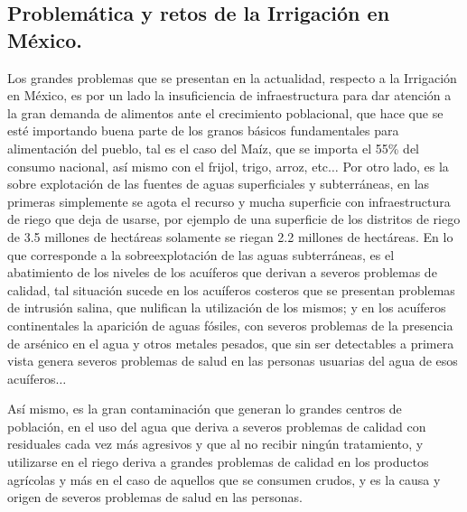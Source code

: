 \subsection{Problemática y retos de la Irrigación en México.}
Los grandes problemas que se presentan en la actualidad, respecto a la Irrigación en México, es por un lado la insuficiencia de infraestructura para dar atención a la gran demanda de alimentos ante el crecimiento poblacional, que hace que se esté importando buena parte de los granos básicos fundamentales para alimentación del pueblo, tal es el caso del Maíz, que se importa el 55\% del consumo nacional, así mismo con el frijol, trigo, arroz, etc$\ldots$ Por otro lado, es la sobre explotación de las fuentes de aguas superficiales y subterráneas, en las primeras simplemente se agota el recurso y mucha superficie con infraestructura de riego que deja de usarse, por ejemplo de una superficie de los distritos de riego de 3.5 millones de hectáreas solamente se riegan 2.2 millones de hectáreas. En lo que corresponde a la sobreexplotación de las aguas subterráneas, es el abatimiento de los niveles de los acuíferos que derivan a severos problemas de calidad, tal situación sucede en los acuíferos costeros que se presentan problemas de intrusión salina, que nulifican la utilización de los mismos; y en los acuíferos continentales la aparición de aguas fósiles, con severos problemas de la presencia de arsénico en el agua y otros metales pesados, que sin ser detectables a primera vista genera severos problemas de salud en las personas usuarias del agua de esos acuíferos$\ldots$

Así mismo, es la gran contaminación que generan lo grandes centros de población, en el uso del agua que deriva a severos problemas de calidad con residuales cada vez más agresivos y que al no recibir ningún tratamiento, y utilizarse en el riego deriva a grandes problemas de calidad en los productos agrícolas y más en el caso de aquellos que se consumen crudos, y es la causa y origen de severos problemas de salud en las personas.
